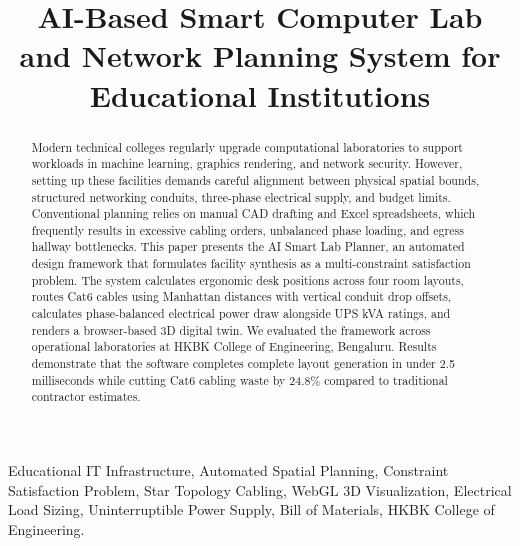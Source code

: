 \documentclass[conference]{IEEEtran}
\begin{document}
\title{AI-Based Smart Computer Lab and Network Planning System for Educational Institutions\\
}

\author{
}

\maketitle

\begin{abstract}
Modern technical colleges regularly upgrade computational laboratories to support workloads in machine learning, graphics rendering, and network security. However, setting up these facilities demands careful alignment between physical spatial bounds, structured networking conduits, three-phase electrical supply, and budget limits. Conventional planning relies on manual CAD drafting and Excel spreadsheets, which frequently results in excessive cabling orders, unbalanced phase loading, and egress hallway bottlenecks. This paper presents the AI Smart Lab Planner, an automated design framework that formulates facility synthesis as a multi-constraint satisfaction problem. The system calculates ergonomic desk positions across four room layouts, routes Cat6 cables using Manhattan distances with vertical conduit drop offsets, calculates phase-balanced electrical power draw alongside UPS kVA ratings, and renders a browser-based 3D digital twin. We evaluated the framework across operational laboratories at HKBK College of Engineering, Bengaluru. Results demonstrate that the software completes complete layout generation in under 2.5 milliseconds while cutting Cat6 cabling waste by 24.8\% compared to traditional contractor estimates.
\end{abstract}

\begin{IEEEkeywords}
Educational IT Infrastructure, Automated Spatial Planning, Constraint Satisfaction Problem, Star Topology Cabling, WebGL 3D Visualization, Electrical Load Sizing, Uninterruptible Power Supply, Bill of Materials, HKBK College of Engineering.
\end{IEEEkeywords}
\end{document}

